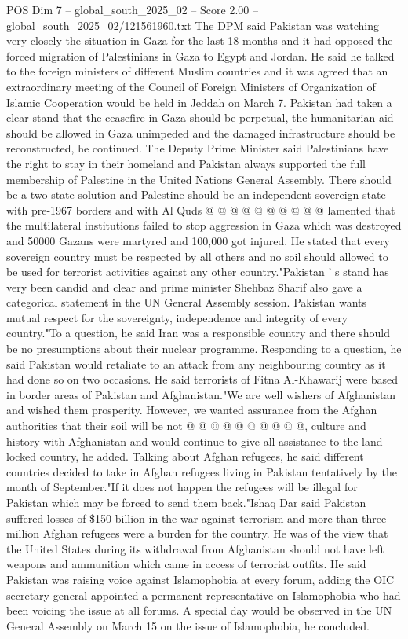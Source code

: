 \begin{textsample}{POS Dim 7 – global\_south\_2025\_02 – Score 2.00 – global\_south\_2025\_02/121561960.txt}
The DPM said Pakistan was watching very closely the situation in Gaza for the last 18 months and it had opposed the forced migration of Palestinians in Gaza to Egypt and Jordan.
He said he talked to the foreign ministers of different Muslim countries and it was agreed that an extraordinary meeting of the Council of Foreign Ministers of Organization of Islamic Cooperation would be held in Jeddah on March 7.
Pakistan had taken a clear stand that the ceasefire in Gaza should be perpetual, the humanitarian aid should be allowed in Gaza unimpeded and the damaged infrastructure should be reconstructed, he continued.
The Deputy Prime Minister said Palestinians have the right to stay in their homeland and Pakistan always supported the full membership of Palestine in the United Nations General Assembly.
There should be a two state solution and Palestine should be an independent sovereign state with pre-1967 borders and with Al Quds @ @ @ @ @ @ @ @ @ @ lamented that the multilateral institutions failed to stop aggression in Gaza which was destroyed and 50000 Gazans were martyred and 100,000 got injured.
He stated that every sovereign country must be respected by all others and no soil should allowed to be used for terrorist activities against any other country."Pakistan ' s stand has very been candid and clear and prime minister Shehbaz Sharif also gave a categorical statement in the UN General Assembly session.
Pakistan wants mutual respect for the sovereignty, independence and integrity of every country."To a question, he said Iran was a responsible country and there should be no presumptions about their nuclear programme.
Responding to a question, he said Pakistan would retaliate to an attack from any neighbouring country as it had done so on two occasions.
He said terrorists of Fitna Al-Khawarij were based in border areas of Pakistan and Afghanistan."We are well wishers of Afghanistan and wished them prosperity.
However, we wanted assurance from the Afghan authorities that their soil will be not @ @ @ @ @ @ @ @ @ @, culture and history with Afghanistan and would continue to give all assistance to the land-locked country, he added.
Talking about Afghan refugees, he said different countries decided to take in Afghan refugees living in Pakistan tentatively by the month of September."If it does not happen the refugees will be illegal for Pakistan which may be forced to send them back."Ishaq Dar said Pakistan suffered losses of \$150 billion in the war against terrorism and more than three million Afghan refugees were a burden for the country.
He was of the view that the United States during its withdrawal from Afghanistan should not have left weapons and ammunition which came in access of terrorist outfits.
He said Pakistan was raising voice against Islamophobia at every forum, adding the OIC secretary general appointed a permanent representative on Islamophobia who had been voicing the issue at all forums.
A special day would be observed in the UN General Assembly on March 15 on the issue of Islamophobia, he concluded.

\end{textsample}
